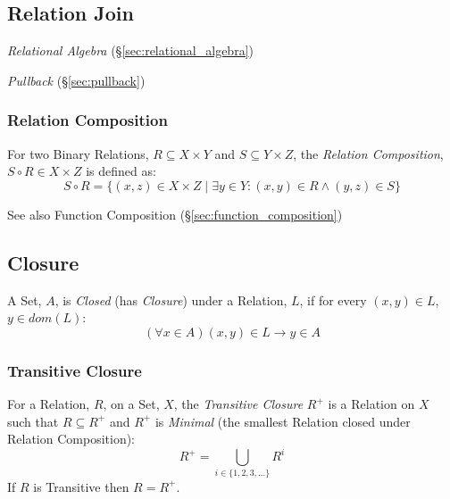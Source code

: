 \subsection{Relation Join}\label{sec:relation_join}

\emph{Relational Algebra} (\S\ref{sec:relational_algebra})

\emph{Pullback} (\S\ref{sec:pullback})



\subsubsection{Relation Composition}\label{sec:relation_composition}

For two Binary Relations, $R \subseteq X \times Y$ and $S \subseteq Y
\times Z$, the \emph{Relation Composition}, $S \circ R \in X \times Z$
is defined as:
\[
  S \circ R = \{(x,z) \in X \times Z \;|\;
  \exists y \in Y : (x,y) \in R \wedge (y,z) \in S \}
\]

See also Function Composition (\S\ref{sec:function_composition})



\subsection{Closure}\label{sec:closure}

A Set, $A$, is \emph{Closed} (has \emph{Closure}) under a Relation,
$L$, if for every $(x,y) \in L$, $y \in dom(L)$:
\[
  (\forall x \in A) (x,y) \in L \to y \in A
\]



\subsubsection{Transitive Closure}\label{sec:transitive_closure}

For a Relation, $R$, on a Set, $X$, the \emph{Transitive Closure}
$R^+$ is a Relation on $X$ such that $R \subseteq R^+$ and $R^+$ is
\emph{Minimal} (the smallest Relation closed under Relation
Composition):
\[
  R^+ = \bigcup_{i \in \{1,2,3,...\}} R^i
\]
If $R$ is Transitive then $R = R^+$.

